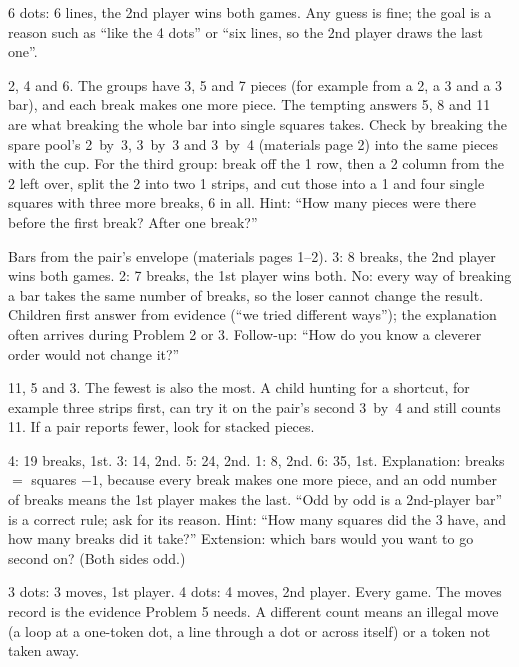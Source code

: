 6 dots: 6 lines, the 2nd player wins both games. Any guess is fine; the goal is a reason such as ``like the 4 dots'' or ``six lines, so the 2nd player draws the last one''.

2, 4 and 6. The groups have 3, 5 and 7 pieces (for example from a 2, a 3 and a 3 bar), and each break makes one more piece. The tempting answers 5, 8 and 11 are what breaking the whole bar into single squares takes. Check by breaking the spare pool's 2~by~3, 3~by~3 and 3~by~4 (materials page 2) into the same pieces with the cup. For the third group: break off the 1 row, then a 2 column from the 2 left over, split the 2 into two 1 strips, and cut those into a 1 and four single squares with three more breaks, 6 in all. Hint: ``How many pieces were there before the first break? After one break?''

Bars from the pair's envelope (materials pages 1--2). 3: 8 breaks, the 2nd player wins both games. 2: 7 breaks, the 1st player wins both. No: every way of breaking a bar takes the same number of breaks, so the loser cannot change the result. Children first answer from evidence (``we tried different ways''); the explanation often arrives during Problem 2 or 3. Follow-up: ``How do you know a cleverer order would not change it?''

11, 5 and 3. The fewest is also the most. A child hunting for a shortcut, for example three strips first, can try it on the pair's second 3~by~4 and still counts 11. If a pair reports fewer, look for stacked pieces.

4: 19 breaks, 1st. 3: 14, 2nd. 5: 24, 2nd. 1: 8, 2nd. 6: 35, 1st. Explanation: breaks $=$ squares $-1$, because every break makes one more piece, and an odd number of breaks means the 1st player makes the last. ``Odd by odd is a 2nd-player bar'' is a correct rule; ask for its reason. Hint: ``How many squares did the 3 have, and how many breaks did it take?'' Extension: which bars would you want to go second on? (Both sides odd.)

3 dots: 3 moves, 1st player. 4 dots: 4 moves, 2nd player. Every game. The moves record is the evidence Problem 5 needs. A different count means an illegal move (a loop at a one-token dot, a line through a dot or across itself) or a token not taken away.


